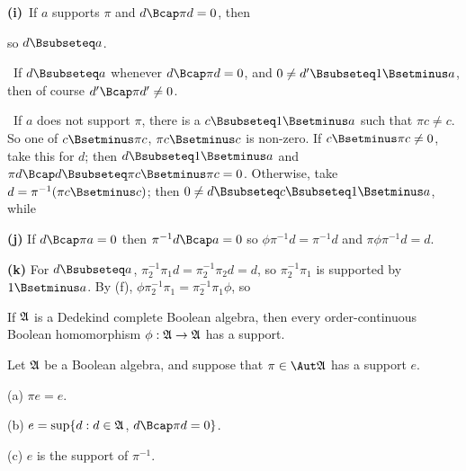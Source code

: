 {\medskip

{\bf (i)}\grheada\ If $a$ supports $\pi$ and $d\Bcap\pi d=0$, then


\noindent so $d\Bsubseteq a$.

\medskip

\quad\grheadb\ If $d\Bsubseteq a$ whenever $d\Bcap\pi d=0$, and
$0\ne d'\Bsubseteq 1\Bsetminus a$, then of course $d'\Bcap\pi d'\ne 0$.

\medskip

\quad\grheadc\ If $a$ does not support $\pi$, there is a
$c\Bsubseteq 1\Bsetminus a$ such that $\pi c\ne c$.   So one of
$c\Bsetminus\pi c$, $\pi c\Bsetminus c$ is non-zero.   If
$c\Bsetminus\pi c\ne 0$, take this for $d$;  then
$d\Bsubseteq 1\Bsetminus a$ and
$\pi d\Bcap d\Bsubseteq\pi c\Bsetminus\pi c=0$.   Otherwise, take
$d=\pi^{-1}(\pi c\Bsetminus c)$;  then
$0\ne d\Bsubseteq c\Bsubseteq 1\Bsetminus a$, while


\medskip

{\bf (j)} If $d\Bcap\pi a=0$ then $\pi^{-1}d\Bcap a=0$ so
$\phi\pi^{-1}d=\pi^{-1}d$ and $\pi\phi\pi^{-1}d=d$.

\medskip

{\bf (k)}  For $d\Bsubseteq a$, $\pi_2^{-1}\pi_1 d=\pi_2^{-1}\pi_2 d=d$,
so $\pi_2^{-1}\pi_1$ is supported by $1\Bsetminus a$.   By (f),
$\phi\pi_2^{-1}\pi_1=\pi_2^{-1}\pi_1\phi$, so

}%

 If $\frak A$ is a Dedekind complete Boolean
algebra, then every order-continuous Boolean homomorphism
$\phi:\frak A\to\frak A$ has a support.


 Let $\frak A$ be a Boolean algebra, and suppose
that $\pi\in\Aut\frak A$ has a support $e$.

(a) $\pi e=e$.

(b) $e=\sup\{d:d\in\frak A$, $d\Bcap\pi d=0\}$.

(c) $e$ is the support of $\pi^{-1}$.

